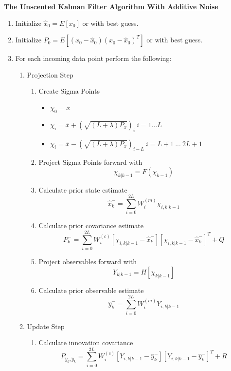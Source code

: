     
\begin{tcolorbox} 

\textbf{\underline{The Unscented Kalman Filter Algorithm With Additive Noise}} 
\begin{enumerate}
    \item Initialize $\hat{x}_0 = E[x_0]$ or with best guess.
    \item Initialize $P_0 = E[(x_0 - \hat{x}_0)(x_0 - \hat{x}_0)^T]$ or with best guess.
    \item For each incoming data point perform the following:
    \begin{enumerate}
        \item Projection Step
        \begin{enumerate}
            \item Create Sigma Points 
            \begin{itemize}
                \item  $\chi_0 = \bar{x}$
                \item $ \chi_i = \bar{x} + (\sqrt{(L + \lambda)P_x})_i \ i = 1 ... L $
                \item $ \chi_i = \bar{x} - (\sqrt{(L + \lambda)P_x})_{i - L} \ i = L + 1 \  ...  \ 2L + 1 $
            \end{itemize}
            \item Project Sigma Points forward with
            $$\chi_{k|k-1} = F(\chi_{k-1})$$
            \item Calculate prior state estimate
            $$ \hat{x}_k^- = \sum_{i = 0}^{2L} W_i^{(m)} \chi_{i, k|k-1}$$
            \item Calculate prior covariance estimate 
            $$ P_k^- = \sum_{i = 0}^{2L} W_i^{(c)} [\chi_{i, k|k-1} - \hat{x}_k^-][\chi_{i, k|k-1} - \hat{x}_k^-]^T + Q$$
            \item Project observables forward with 
            $$Y_{k|k-1} = H[\chi_{k|k-1}]$$
            \item Calculate prior observable estimate 
            $$\hat{y}_k^- = \sum_{i=0}^{2L} W_i^{(m)} Y_{i,k|k-1}$$
        \end{enumerate}
        \item Update Step
        \begin{enumerate}
            \item Calculate innovation covariance 
            $$P_{\tilde{y}_k, \tilde{y}_k} = \sum_{i=0}^{2L} W_i^{(c)} [Y_{i,k|k-1} - \hat{y}_k^-][Y_{i,k|k-1} - \hat{y}_k^-]^T + R$$

\end{enumerate}
\end{enumerate}
\end{enumerate}
\end{tcolorbox}
